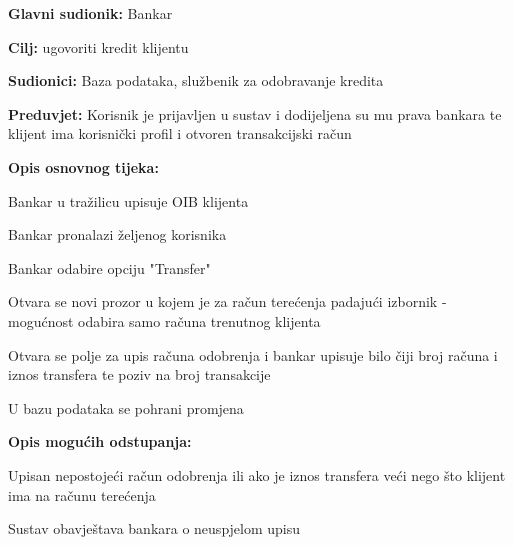 	            \noindent {}
	            \begin{packed_item}
	            	
	            	\item \textbf{Glavni sudionik: }Bankar
	            	\item  \textbf{Cilj:} ugovoriti kredit klijentu
	            	\item  \textbf{Sudionici:} Baza podataka, službenik za odobravanje kredita
	            	\item  \textbf{Preduvjet:} Korisnik je prijavljen u sustav i dodijeljena su mu prava bankara te klijent ima korisnički profil i otvoren transakcijski račun
	            	\item  \textbf{Opis osnovnog tijeka:}
	            	
	            	\item[] \begin{packed_enum}
	            		
	            		\item Bankar u tražilicu upisuje OIB klijenta
	            		\item Bankar pronalazi željenog korisnika
	            		\item Bankar odabire opciju "Transfer"
	            		\item Otvara se novi prozor u kojem je za račun terećenja padajući izbornik - mogućnost odabira samo računa trenutnog klijenta
	            		\item Otvara se polje za upis računa odobrenja i bankar upisuje bilo čiji broj računa i iznos transfera te poziv na broj transakcije
	            		\item U bazu podataka se pohrani promjena 
	            	\end{packed_enum}
	            	
	            	\item  \textbf{Opis mogućih odstupanja:} 
	            	
	            	\item[] \begin{packed_item}
	            		
	            		\item[3.a] Upisan nepostojeći račun  odobrenja ili ako je iznos transfera veći nego što klijent ima na računu terećenja
	            		\item[] \begin{packed_enum}
	            			
	            			\item Sustav obavještava bankara o neuspjelom upisu 
	            			
	            		\end{packed_enum}
	            		
	            	\end{packed_item}
	            \end{packed_item}
                            
